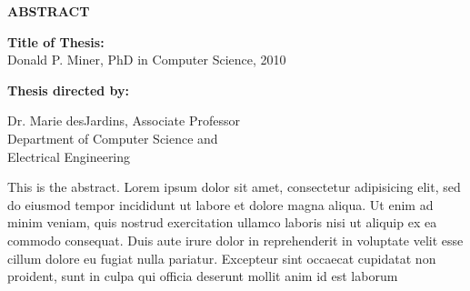 \newpage
\pagestyle{empty}

\begin{center}
\vspace{0.1in}
\large{\bf ABSTRACT} \par  
\bigskip \bigskip
\end{center}

\begin{flushleft}
{\bf Title of Thesis:} \thesistitle\\
Donald P. Miner, PhD in Computer Science, 2010 \\
\begin{singlespace}
{\bf Thesis directed by:}{\hspace{2.5mm}} \parbox[t]{3in}{Dr. Marie desJardins, Associate Professor\\
Department of Computer Science and \\ Electrical Engineering}
\end{singlespace}
\end{flushleft}

This is the abstract.
Lorem ipsum dolor sit amet, consectetur adipisicing elit, sed do eiusmod tempor incididunt ut labore et dolore magna aliqua. Ut enim ad minim veniam, quis nostrud exercitation ullamco laboris nisi ut aliquip ex ea commodo consequat. Duis aute irure dolor in reprehenderit in voluptate velit esse cillum dolore eu fugiat nulla pariatur. Excepteur sint occaecat cupidatat non proident, sunt in culpa qui officia deserunt mollit anim id est laborum


\par\vfil

